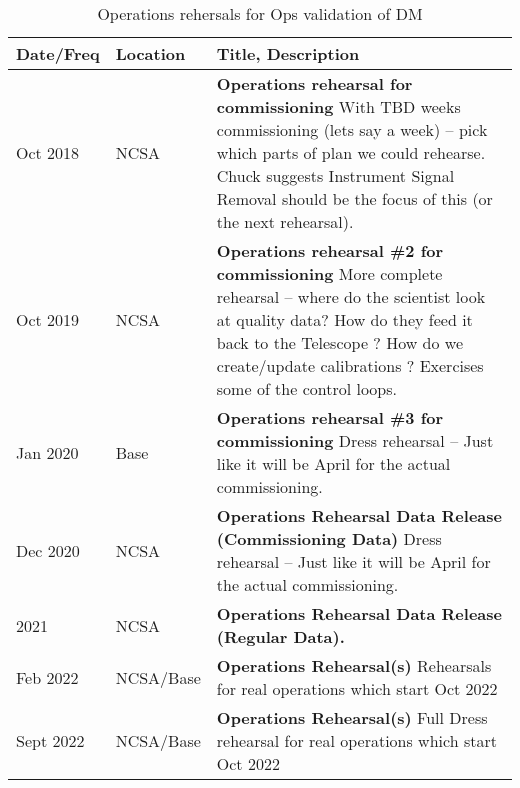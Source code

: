 \begin{longtable} {|l|l|p{}|}
	\caption{Operations rehersals for Ops validation of DM \label{tab:ors}}\\  %
	\hline
\textbf{Date/Freq} &\textbf{Location}& \textbf{Title, Description} \\ \hline

Oct 2018 &  NCSA & \textbf{Operations rehearsal for commissioning }
	With TBD weeks commissioning (lets say a week) -- pick which parts of plan we could rehearse.
	Chuck suggests Instrument Signal Removal should be the focus of this (or the next rehearsal).
	\\ \hline
Oct 2019 & NCSA &  \textbf{ Operations rehearsal \#2 for commissioning}
More complete rehearsal -- where do the scientist look at quality data? How do they feed it back to the Telescope ?
How do we create/update calibrations ? Exercises some of the control loops.
\\ \hline
Jan 2020 & Base  &  \textbf{ Operations rehearsal \#3 for commissioning}
Dress rehearsal -- Just like it will be April for the actual commissioning.
	\\ \hline
Dec 2020 &  NCSA &  \textbf{Operations  Rehearsal Data Release (Commissioning Data)}
	Dress rehearsal -- Just like it will be April for the actual commissioning.
	\\ \hline

2021 &  NCSA &  \textbf{Operations  Rehearsal Data Release (Regular Data).}
	\\ \hline

Feb 2022 &  NCSA/Base &  \textbf{Operations  Rehearsal(s)}
Rehearsals for real operations which start Oct 2022
	\\ \hline
Sept 2022 &  NCSA/Base &  \textbf{Operations  Rehearsal(s)}
Full Dress rehearsal for real operations which start Oct 2022
	\\ \hline


\end{longtable}
